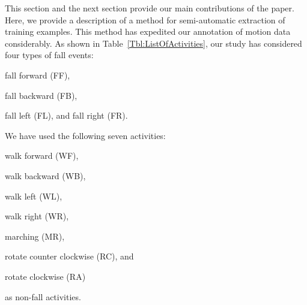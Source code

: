 \documentclass[]{IEEEtran}
\begin{document}
This section and the next section provide our main contributions of the paper.
Here, we provide a description of a method for semi-automatic extraction of
training examples. This method has expedited our annotation of motion data
considerably. As shown in Table~\ref{Tbl:ListOfActivities},  our study has
considered four types of fall events: \begin{inparaenum}[1)] \item fall forward
({\sf FF}), \item fall backward ({\sf FB}), \item fall left ({\sf FL}), and
fall right ({\sf FR}). \end{inparaenum} We have used the following seven
activities:\begin{inparaenum}[1)] \item walk forward ({\sf WF}), \item walk
backward ({\sf WB}), \item walk left ({\sf WL}), \item walk right ({\sf WR}),
\item marching ({\sf MR}), \item rotate counter clockwise ({\sf RC}), and \item
rotate clockwise ({\sf RA})  \end{inparaenum} as non-fall activities. 

\end{document}
